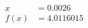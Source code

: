 \documentclass[preview]{standalone}
\begin{document}
\begin{align*}
x &= 0.0026\\f(x) &= 4.0116015
\end{align*}
\end{document}
